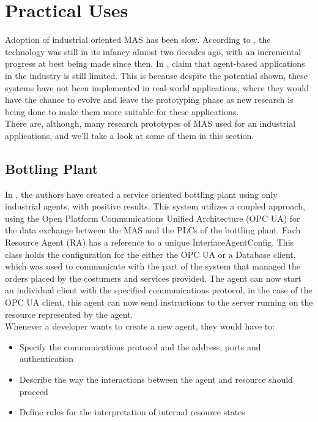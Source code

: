 \section{Practical Uses}

Adoption of industrial oriented MAS has been slow. According to \citeauthor{karnouskos02} \cite{karnouskos02}, the technology was still in its infancy almost two decades ago, with an incremental progress at best being made since then. In \cite{Karnouskos2019}, \citeauthor{Karnouskos2019} claim that agent-based applications in the industry is still limited. This is because despite the potential shown, these systems have not been implemented in real-world applications, where they would have the chance to evolve and leave the prototyping phase as new research is being done to make them more suitable for these applications.\\

There are, although, many research prototypes of MAS used for an industrial applications, and we'll take a look at some of them in this section.

\subsection{Bottling Plant}


In \cite{marschall01}, the authors have created a service oriented bottling plant using only industrial agents, with positive results. This system utilizes a coupled approach, using the Open Platform Communications Unified Architecture (OPC UA) for the data exchange between the MAS and the PLCs of the bottling plant. Each Resource Agent (RA) has a reference to a unique InterfaceAgentConfig. This class holds the configuration for the either the OPC UA or a Database client, which was used to communicate with the part of the system that managed the orders placed by the costumers and services provided. The agent can now start an individual client with the specified communications protocol, in the case of the OPC UA client, this agent can now send instructions to the server running on the resource represented by the agent.\\

Whenever a developer wants to create a new agent, they would have to:
\begin{itemize}
	\item Specify the communications protocol and the address, ports and authentication
	\item Describe the way the interactions between the agent and resource should proceed
	\item Define rules for the interpretation of internal resource states
\end{itemize}

